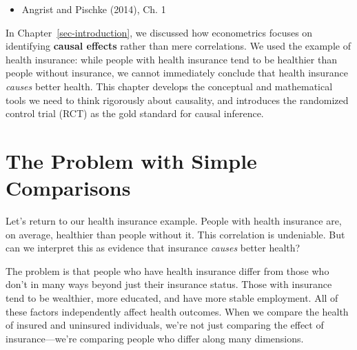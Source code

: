 \documentclass[
  letterpaper,
  DIV=11,
  numbers=noendperiod]{scrreprt}
\providecommand{\tightlist}{%
  \setlength{\itemsep}{0pt}\setlength{\parskip}{0pt}}
\begin{document}
\begin{tcolorbox}[enhanced jigsaw, arc=.35mm, bottomrule=.15mm, bottomtitle=1mm, breakable, colback=white, colbacktitle=quarto-callout-note-color!10!white, colframe=quarto-callout-note-color-frame, coltitle=black, left=2mm, leftrule=.75mm, opacityback=0, opacitybacktitle=0.6, rightrule=.15mm, title=\textcolor{quarto-callout-note-color}{\faInfo}\hspace{0.5em}{\textbf{Suggested Readings}}, titlerule=0mm, toprule=.15mm, toptitle=1mm]

\begin{itemize}
\tightlist
\item
  Angrist and Pischke (2014), Ch. 1
\end{itemize}

\end{tcolorbox}

In Chapter~\ref{sec-introduction}, we discussed how econometrics focuses
on identifying \textbf{causal effects} rather than mere correlations. We
used the example of health insurance: while people with health insurance
tend to be healthier than people without insurance, we cannot
immediately conclude that health insurance \emph{causes} better health.
This chapter develops the conceptual and mathematical tools we need to
think rigorously about causality, and introduces the randomized control
trial (RCT) as the gold standard for causal inference.

\section{The Problem with Simple
Comparisons}\label{the-problem-with-simple-comparisons}

Let's return to our health insurance example. People with health
insurance are, on average, healthier than people without it. This
correlation is undeniable. But can we interpret this as evidence that
insurance \emph{causes} better health?

The problem is that people who have health insurance differ from those
who don't in many ways beyond just their insurance status. Those with
insurance tend to be wealthier, more educated, and have more stable
employment. All of these factors independently affect health outcomes.
When we compare the health of insured and uninsured individuals, we're
not just comparing the effect of insurance---we're comparing people who
differ along many dimensions.
\end{document}
